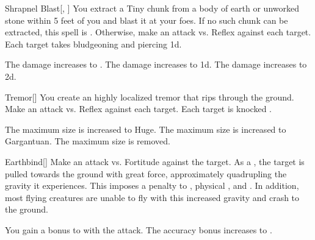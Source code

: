 \lowercase{\hypertarget{spell:Shrapnel Blast}{}}\label{spell:Shrapnel Blast}
\begin{freeability}[Rank 1]{\hypertarget{spell:Shrapnel Blast}{Shrapnel Blast}}[, ]
You extract a Tiny chunk from a body of earth or unworked stone within 5 feet of you and blast it at your foes.
If no such chunk can be extracted, this spell is .
Otherwise, make an attack vs. Reflex against each target.
\hit Each target takes bludgeoning and piercing  \minus1d.

\rankline
{} The damage increases to .
 The damage increases to  \plus1d.
 The damage increases to  \plus2d.
\end{freeability}
\vspace{0.25em}



\lowercase{\hypertarget{spell:Tremor}{}}\label{spell:Tremor}
\begin{freeability}[Rank 1]{\hypertarget{spell:Tremor}{Tremor}}[]
You create an highly localized tremor that rips through the ground.
Make an attack vs. Reflex against each target.
\hit Each target is knocked .

\rankline
{} The maximum size is increased to Huge.
 The maximum size is increased to Gargantuan.
 The maximum size is removed.
\end{freeability}
\vspace{0.25em}



\lowercase{\hypertarget{spell:Earthbind}{}}\label{spell:Earthbind}
\begin{freeability}[Rank 3]{\hypertarget{spell:Earthbind}{Earthbind}}[]
Make an attack vs. Fortitude against the target.
\hit As a , the target is pulled towards the ground with great force, approximately quadrupling the gravity it experiences.
This imposes a  penalty to , physical , and .
In addition, most flying creatures are unable to fly with this increased gravity and crash to the ground.

\rankline
{} You gain a  bonus to  with the attack.
 The accuracy bonus increases to .
\end{freeability}
\vspace{0.25em}



